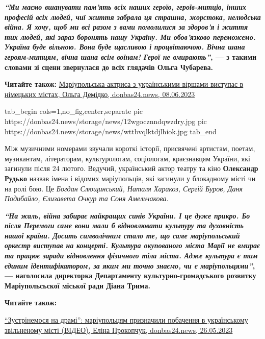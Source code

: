 \begin{leftbar}
  \begingroup
    \bfseries
{\color{blue}\em\enquote{Ми маємо вшанувати пам'ять всіх наших героїв, героїв-митців, інших
професій всіх людей, чиї життя забрала ця страшна, жорстока, нелюдська
війна. Я хочу, щоб ми всі разом з вами помолилися за здоров'я і життя
тих людей, які зараз боронять нашу Україну. Ми обов'язково переможемо.
Україна буде вільною. Вона буде щасливою і процвітаючою. Вічна шана
героям-митцям, вічна шана всім воїнам! Герої не вмирають}}, — з такими
словами зі сцени звернулася до всіх глядачів Ольга Чубарева. 
  \endgroup
\end{leftbar}

\textbf{Читайте також:} \href{https://donbas24.news/news/mariupolska-aktrisa-z-ukrayinskimi-virsami-vistupaje-v-nimeckix-mistax}{%
Маріупольська актриса з українськими віршами виступає в німецьких містах, Ольга Демідко, donbas24.news, 08.06.2023}

\ifcmt
  tab_begin cols=1,no_fig,center,separate
     pic https://donbas24.news/storage/news/12wgocznndqwzdry.jpg
     pic https://donbas24.news/storage/news/wttbvqlktdjlhiok.jpg
  tab_end
\fi

Між музичними номерами звучали короткі історії, присвячені артистам, поетам,
музикантам, літераторам, культурологам, соціологам, краєзнавцям України, які
загинули після 24 лютого. Ведучий, український актор театру та кіно \textbf{Олександр
Рудько} назвав імена і відомих маріупольців, які загинули у блокадному місті чи
на ролі бою. Це \emph{Богдан Слющинський, Наталя Харакоз, Сергій Буров, Даня
Подибайло, Єлизавета Очкур та Соня Амельчакова}.

\begin{leftbar}
  \begingroup
    \bfseries
{\em\color{blue}\enquote{На жаль, війна забирає найкращих синів України. І це дуже прикро. Бо
після Перемоги саме вони мали б відновлювати культуру та духовність
нашої країни. Досить символічним стало те, що саме маріупольський
оркестр виступав на концерті. Культура окупованого міста Марії не
вмирає та працює заради відновлення фізичного тіла міста. Адже культура
є тим єдиним ідентифікатором, за яким ми точно знаємо, чи є
маріупольцями}}, — наголосила директорка Департаменту
культурно-громадського розвитку Маріупольсьскої міської ради Діана
Трима.
  \endgroup
\end{leftbar}

\textbf{Читайте також:} 

\href{https://donbas24.news/news/zustrinemosya-na-drami-mariupolciv-rozculilo-proniklive-video-pro-ridne-misto-video}{%
\enquote{Зустрінемося на драмі}: маріупольцям призначили побачення в українському звільненому місті (ВІДЕО), %
Еліна Прокопчук, donbas24.news, 26.05.2023%
}

